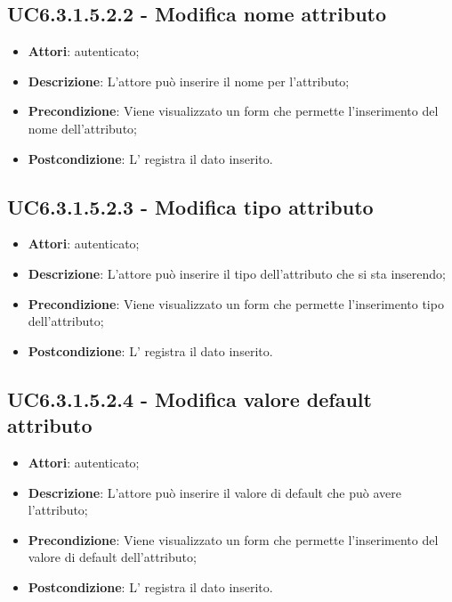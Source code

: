 \subsection{UC6.3.1.5.2.2 - Modifica nome attributo}
\label{ssec:UC6.3.1.5.2.2}
\begin{itemize}
\item \textbf{Attori}:  autenticato;
\item \textbf{Descrizione}: L'attore può inserire il nome per l'attributo;
\item \textbf{Precondizione}: Viene visualizzato un form che permette l'inserimento del nome dell'attributo;
\item \textbf{Postcondizione}: L' registra il dato inserito.
\end{itemize}
\subsection{UC6.3.1.5.2.3 - Modifica tipo attributo}
\label{ssec:UC6.3.1.5.2.3}
\begin{itemize}
\item \textbf{Attori}:  autenticato;
\item \textbf{Descrizione}: L'attore può inserire il tipo dell'attributo che si sta inserendo;
\item \textbf{Precondizione}: Viene visualizzato un form che permette l'inserimento tipo dell'attributo;
\item \textbf{Postcondizione}: L' registra il dato inserito.
\end{itemize}
\subsection{UC6.3.1.5.2.4 - Modifica valore default attributo}
\label{ssec:UC6.3.1.5.2.4}
\begin{itemize}
\item \textbf{Attori}:  autenticato;
\item \textbf{Descrizione}: L'attore può inserire il valore di default che può avere l'attributo;
\item \textbf{Precondizione}: Viene visualizzato un form che permette l'inserimento del valore di default dell'attributo;
\item \textbf{Postcondizione}: L' registra il dato inserito.
\end{itemize}
